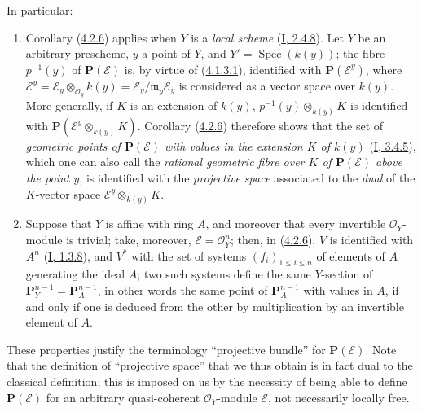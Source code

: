 In particular:
\begin{enumerate}
  \item[1\textsuperscript{o}] Corollary
  (\hyperref[II.4.2.6]{4.2.6}) applies when $Y$ is a
  \emph{local scheme} (\hyperref[I.2.4.8]{I, 2.4.8}). Let $Y$ be an
  arbitrary prescheme, $y$ a point of $Y$, and
  $Y'=\operatorname{Spec}(k(y))$; the fibre $p^{-1}(y)$ of
  $\mathbf{P}(\mathcal{E})$ is, by virtue of
  (\hyperref[II.4.1.3.1]{4.1.3.1}), identified with
  $\mathbf{P}(\mathcal{E}^y)$, where
  $\mathcal{E}^y=\mathcal{E}_y\otimes_{\mathcal{O}_y}k(y)
  =\mathcal{E}_y/\mathfrak{m}_y\mathcal{E}_y$ is considered as a vector
  space over $k(y)$. More generally, if $K$ is an extension of
  $k(y)$, $p^{-1}(y)\otimes_{k(y)}K$ is identified with
  $\mathbf{P}(\mathcal{E}^y\otimes_{k(y)}K)$. Corollary
  (\hyperref[II.4.2.6]{4.2.6}) therefore shows that the set of
  \emph{geometric points of $\mathbf{P}(\mathcal{E})$ with values in
  the extension $K$ of $k(y)$} (\hyperref[I.3.4.5]{I, 3.4.5}), which one
  can also call the \emph{rational geometric fibre over $K$ of
  $\mathbf{P}(\mathcal{E})$ above the point $y$}, is identified with
  the \emph{projective space} associated to the \emph{dual} of the $K$-vector
  space $\mathcal{E}^y\otimes_{k(y)}K$.
  \item[2\textsuperscript{o}] Suppose that $Y$ is affine with ring $A$, and
  moreover that every invertible $\mathcal{O}_Y$-module is trivial; take,
  moreover, $\mathcal{E}=\mathcal{O}_Y^n$; then, in
  (\hyperref[II.4.2.6]{4.2.6}), $V$ is identified with $A^n$
  (\hyperref[I.1.3.8]{I, 1.3.8}), and $V^*$ with the set of systems
  $(f_i)_{1\leq i\leq n}$ of elements of $A$ generating the ideal $A$; two
  such systems define the same $Y$-section of
  $\mathbf{P}_Y^{n-1}=\mathbf{P}_A^{n-1}$, in other words the same point of
  $\mathbf{P}_A^{n-1}$ with values in $A$, if and only if one is deduced
  from the other by multiplication by an invertible element of $A$.
\end{enumerate}

These properties justify the terminology ``projective bundle'' for
$\mathbf{P}(\mathcal{E})$. Note that the definition of ``projective
space'' that we thus obtain is in fact dual to the classical
definition; this is imposed on us by the necessity of being able to define
$\mathbf{P}(\mathcal{E})$ for an arbitrary quasi-coherent $\mathcal{O}_Y$-module
$\mathcal{E}$, not necessarily locally free.

